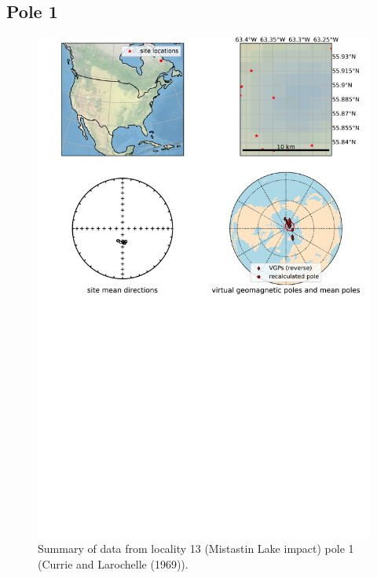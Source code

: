 \documentclass{article}
\begin{document}
\subsection{Pole 1}


\begin{figure}[H]
\centering
\includegraphics[width=5 in]{./13/1/pole_summary.png}
\caption{Summary of data from locality 13 (Mistastin Lake impact) pole 1 (Currie and Larochelle (1969)).}
\end{figure}
\end{document}
